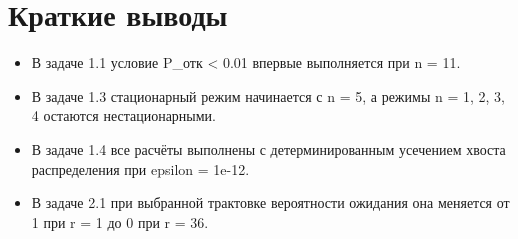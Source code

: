 \documentclass[12pt,a4paper]{article}
\begin{document}
\section*{Краткие выводы}
\begin{itemize}
    \item В задаче 1.1 условие P\_отк < 0.01 впервые выполняется при n = 11.
    \item В задаче 1.3 стационарный режим начинается с n = 5, а режимы n = 1, 2, 3, 4 остаются нестационарными.
    \item В задаче 1.4 все расчёты выполнены с детерминированным усечением хвоста распределения при epsilon = 1e-12.
    \item В задаче 2.1 при выбранной трактовке вероятности ожидания она меняется от 1 при r = 1 до 0 при r = 36.
\end{itemize}
\end{document}
